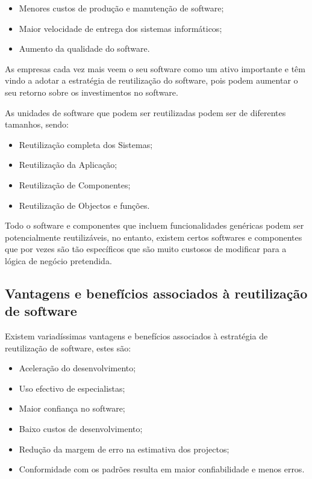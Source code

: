 \documentclass[runningheads]{llncs}
\begin{document}
\begin{itemize}
    \item Menores custos de produção e manutenção de software;
    \item Maior velocidade de entrega dos sistemas informáticos;
    \item Aumento da qualidade do software.
\end{itemize}

As empresas cada vez mais veem o seu software como um ativo importante e têm vindo a  adotar a estratégia de reutilização do software, pois podem aumentar o seu retorno sobre os investimentos no software.\par
As unidades de software que podem ser reutilizadas podem ser de diferentes tamanhos, sendo:

\begin{itemize}
    \item Reutilização completa dos Sistemas;
    \item Reutilização da Aplicação;
    \item Reutilização de Componentes;
    \item Reutilização de Objectos e funções.
\end{itemize}

Todo o software e componentes que incluem funcionalidades genéricas podem ser potencialmente reutilizáveis, no entanto, existem certos softwares e componentes que por vezes são tão específicos que são muito custosos de modificar para a lógica de negócio pretendida.

\subsection{Vantagens e benefícios associados à reutilização de software}

Existem variadíssimas vantagens e benefícios associados à estratégia de reutilização de software, estes são:

\begin{itemize}
    \item Aceleração do desenvolvimento;
    \item Uso efectivo de especialistas;
    \item Maior confiança no software;
    \item Baixo custos de desenvolvimento;
    \item Redução da margem de erro na estimativa dos projectos;
    \item Conformidade com os padrões resulta em maior confiabilidade e menos erros.
\end{itemize}
\end{document}
